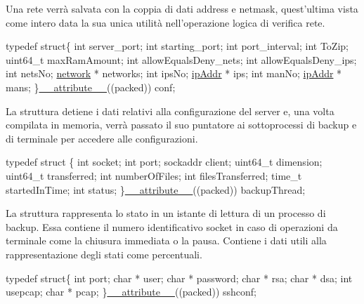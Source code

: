 Una rete verrà salvata con la coppia di dati address e netmask, quest’ultima vista come intero data la sua unica utilità nell’operazione logica di verifica rete.


\begin{DoxyCode}
\textcolor{keyword}{typedef} \textcolor{keyword}{struct}\{
   \textcolor{keywordtype}{int} server\_port;
   \textcolor{keywordtype}{int} starting\_port;
   \textcolor{keywordtype}{int} port\_interval;
   \textcolor{keywordtype}{int} ToZip;
   uint64\_t maxRamAmount;
   \textcolor{keywordtype}{int} allowEqualsDeny\_nets;
   \textcolor{keywordtype}{int} allowEqualsDeny\_ips;
   \textcolor{keywordtype}{int} netsNo;
   \hyperlink{structnetwork}{network} * networks;
   \textcolor{keywordtype}{int} ipsNo;
   \hyperlink{unionipAddr}{ipAddr} * ips;
   \textcolor{keywordtype}{int} manNo;
   \hyperlink{unionipAddr}{ipAddr} * mans;
\}\hyperlink{struct____attribute____}{\_\_attribute\_\_}((packed)) conf;
\end{DoxyCode}


La struttura detiene i dati relativi alla configurazione del server e, una volta compilata in memoria, verrà passato il suo puntatore ai sottoprocessi di backup e di terminale per accedere alle configurazioni. 
\begin{DoxyCode}
\textcolor{keyword}{typedef} \textcolor{keyword}{struct }\{
   \textcolor{keywordtype}{int} socket;
   \textcolor{keywordtype}{int} port;
   sockaddr client;
   uint64\_t dimension;
   uint64\_t transferred;
   \textcolor{keywordtype}{int} numberOfFiles;
   \textcolor{keywordtype}{int} filesTransferred;
   time\_t startedInTime;
   \textcolor{keywordtype}{int} status;
\}\hyperlink{struct____attribute____}{\_\_attribute\_\_}((packed)) backupThread;
\end{DoxyCode}


La struttura rappresenta lo stato in un istante di lettura di un processo di backup. Essa contiene il numero identificativo socket in caso di operazioni da terminale come la chiusura immediata o la pausa. Contiene i dati utili alla rappresentazione degli stati come percentuali. 
\begin{DoxyCode}
\textcolor{keyword}{typedef} \textcolor{keyword}{struct}\{
   \textcolor{keywordtype}{int} port;
   \textcolor{keywordtype}{char} * user;
   \textcolor{keywordtype}{char} * password;
   \textcolor{keywordtype}{char} * rsa;
   \textcolor{keywordtype}{char} * dsa;
   \textcolor{keywordtype}{int} usepcap;
   \textcolor{keywordtype}{char} * pcap;
\}\hyperlink{struct____attribute____}{\_\_attribute\_\_}((packed)) sshconf;
\end{DoxyCode}


